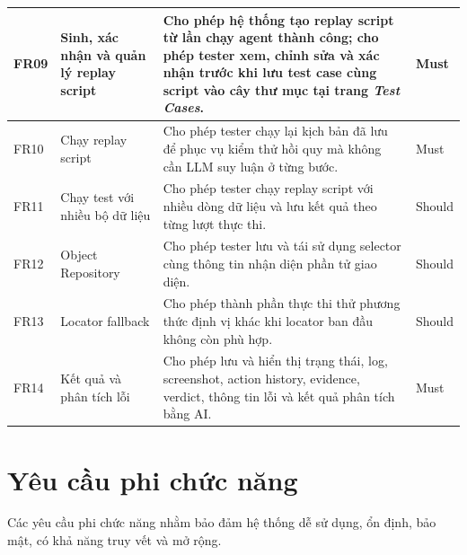 {\begin{longtable}{|p{1.5cm}|p{3.4cm}|p{8.1cm}|p{1.6cm}|}
FR09 &
Sinh, xác nhận và quản lý replay script &
Cho phép hệ thống tạo replay script từ lần chạy agent thành công; cho phép tester xem, chỉnh sửa và xác nhận trước khi lưu test case cùng script vào cây thư mục tại trang \textit{Test Cases}. &
Must \\
\hline

FR10 &
Chạy replay script &
Cho phép tester chạy lại kịch bản đã lưu để phục vụ kiểm thử hồi quy mà không cần LLM suy luận ở từng bước. &
Must \\
\hline

FR11 &
Chạy test với nhiều bộ dữ liệu &
Cho phép tester chạy replay script với nhiều dòng dữ liệu và lưu kết quả theo từng lượt thực thi. &
Should \\
\hline

FR12 &
Object Repository &
Cho phép tester lưu và tái sử dụng selector cùng thông tin nhận diện phần tử giao diện. &
Should \\
\hline

FR13 &
Locator fallback &
Cho phép thành phần thực thi thử phương thức định vị khác khi locator ban đầu không còn phù hợp. &
Should \\
\hline

FR14 &
Kết quả và phân tích lỗi &
Cho phép lưu và hiển thị trạng thái, log, screenshot, action history, evidence, verdict, thông tin lỗi và kết quả phân tích bằng AI. &
Must \\
\hline

\end{longtable}
}

\section{Yêu cầu phi chức năng}

Các yêu cầu phi chức năng nhằm bảo đảm hệ thống dễ sử dụng, ổn định, bảo mật, có khả năng truy vết và mở rộng.

